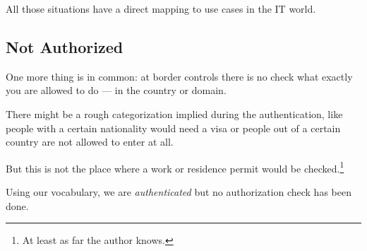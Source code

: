 All those situations have a direct mapping to use cases in the IT world.


\subsection{Not Authorized}

One more thing is in common: at border controls there is no check what
exactly you are allowed to do --- in the country or domain.

There might be a rough categorization implied during the authentication,
like people with a certain nationality would need a visa or people out
of a certain country are not allowed to enter at all.

But this is not the place where a work or residence permit would be
checked.\footnote{At least as far the author knows.}

Using our vocabulary, we are \emph{authenticated} but no authorization
check has been done.

